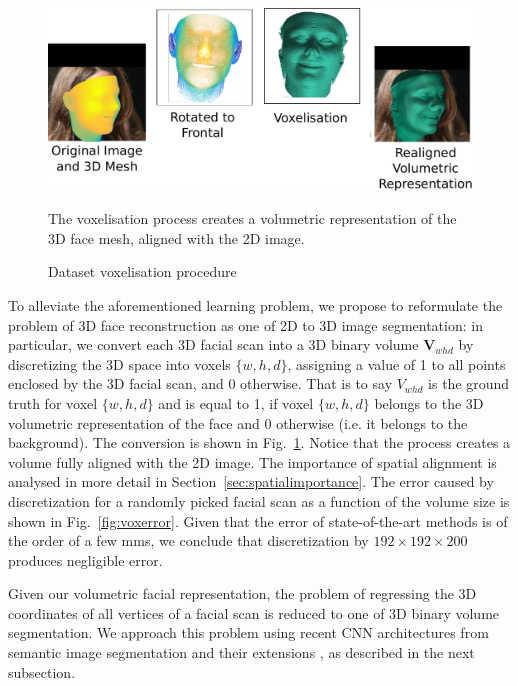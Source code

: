 \begin{figure}
  \centering
  \includegraphics[width=\linewidth]{img/discretisation.pdf}
  \caption{Dataset voxelisation procedure}{The voxelisation process
    creates a volumetric representation of the 3D face mesh, aligned
    with the 2D image.}
  \label{fig:discretisation}
\end{figure}

To alleviate the aforementioned learning problem, we propose to
reformulate the problem of 3D face reconstruction as one of 2D to 3D
image segmentation: in particular, we convert each 3D facial scan into 
a 3D binary volume $\mathbf{V}_{whd}$ by discretizing the 3D space
into voxels $\{w,h,d\}$, assigning a value of 1 to all
points enclosed by the 3D facial scan, and 0 otherwise. That is to say
$ V_{whd}$ is the ground truth for voxel $\{w,h,d\}$ and is equal to
1, if voxel $\{w,h,d\}$ belongs to the 3D volumetric representation of
the face and 0 otherwise (i.e. it belongs to the background). The
conversion is shown in Fig.~\ref{fig:discretisation}. Notice that the process creates a volume fully aligned with the 2D image. The importance of spatial alignment is analysed in more detail in Section~\ref{sec:spatialimportance}. The error caused by
discretization for a randomly picked facial scan as a function of the
volume size is shown in Fig.~\ref{fig:voxerror}. Given that the error of
state-of-the-art methods
\cite{roth2016adaptive,liu2016joint} is of the order of a few mms, we
conclude that discretization by $192\times 192\times 200$ produces negligible
error.

Given our volumetric facial representation, the problem of regressing
the 3D coordinates of all vertices of a facial scan is reduced to one
of 3D binary volume segmentation. We approach this problem using
recent CNN architectures from semantic image segmentation
\cite{long2015fully} and their extensions \cite{newell2016stacked}, as
described in the next subsection.

